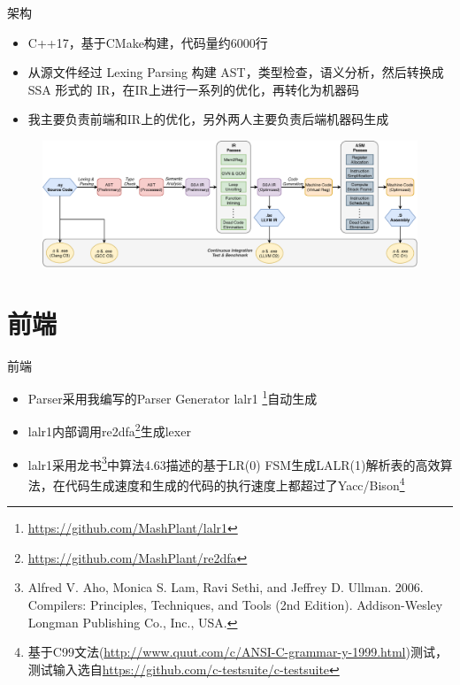 \documentclass{beamer}
\begin{document}
\begin{frame}{架构}
\begin{itemize}
  \item C++17，基于CMake构建，代码量约6000行
  \item 从源文件经过 Lexing Parsing 构建 AST，类型检查，语义分析，然后转换成 SSA 形式的 IR，在IR上进行一系列的优化，再转化为机器码
  \item 我主要负责前端和IR上的优化，另外两人主要负责后端机器码生成
\end{itemize}
  \begin{figure}[htpb]
  \centering
  \includegraphics[width=1.0\linewidth]{pic/arch.png}
\end{figure}
\end{frame}

\section{前端}

\begin{frame}{前端}
\begin{itemize}
  \item Parser采用我编写的Parser Generator lalr1 \footnote{\href{https://github.com/MashPlant/lalr1}{https://github.com/MashPlant/lalr1}}自动生成
  \item lalr1内部调用re2dfa\footnote{\href{https://github.com/MashPlant/re2dfa}{https://github.com/MashPlant/re2dfa}}生成lexer
  \item lalr1采用龙书\footnote{Alfred V. Aho, Monica S. Lam, Ravi Sethi, and Jeffrey D. Ullman. 2006. Compilers: Principles, Techniques, and Tools (2nd Edition). Addison-Wesley Longman Publishing Co., Inc., USA.}中算法4.63描述的基于LR(0) FSM生成LALR(1)解析表的高效算法，在代码生成速度和生成的代码的执行速度上都超过了Yacc/Bison\footnote{基于C99文法(\href{http://www.quut.com/c/ANSI-C-grammar-y-1999.html}{http://www.quut.com/c/ANSI-C-grammar-y-1999.html})测试，测试输入选自\href{https://github.com/c-testsuite/c-testsuite}{https://github.com/c-testsuite/c-testsuite}}
\end{itemize}
\end{frame}
\end{document}
